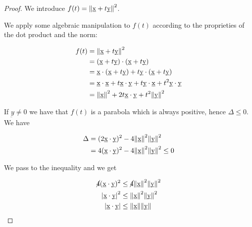 \documentclass[10pt]{extarticle}
\begin{document}
\begin{proof}
    We introduce $f(t) = \norm{\underbar{x} + t \underbar{y}}^2$.

    We apply some algebraic manipulation to $f(t)$ according to the proprieties of the dot product and the norm:

    \begin{align*}
        f(t) & = \norm{\underbar{x} + t \underbar{y}}^2                                                                                                        \\
             & = (\underbar{x} + t \underbar{y}) \cdot (\underbar{x} + t \underbar{y})                                                                         \\
             & = \underbar{x} \cdot (\underbar{x} + t \underbar{y}) + t \underbar{y} \cdot (\underbar{x} + t \underbar{y})                                     \\
             & = \underbar{x} \cdot \underbar{x} + t \underbar{x} \cdot \underbar{y} + t \underbar{y} \cdot \underbar{x} + t^2 \underbar{y} \cdot \underbar{y} \\
             & = \norm{\underbar{x}}^2 + 2t \underbar{x} \cdot \underbar{y} + t^2 \norm{\underbar{y}}^2
    \end{align*}

    If $\underbar{y} \ne 0$ we have that $f(t)$ is a parabola which is always positive, hence $\Delta \leq 0$. We have

    \begin{align*}
        \Delta & = (2 \underbar{x} \cdot \underbar{y})^2 - 4 \norm{\underbar{x}}^2 \norm{\underbar{y}}^2        \\
               & = 4 (\underbar{x} \cdot \underbar{y})^2 - 4 \norm{\underbar{x}}^2 \norm{\underbar{y}}^2 \leq 0 \\
    \end{align*}

    We pass to the inequality and we get

    \begin{align*}
        \cancel{4}(\underbar{x} \cdot \underbar{y})^2 & \leq \cancel{4} \norm{\underbar{x}}^2 \norm{\underbar{y}}^2 \\
        \abs{\underbar{x} \cdot \underbar{y}} ^2      & \leq \norm{\underbar{x}}^2 \norm{\underbar{y}}^2            \\
        \abs{\underbar{x} \cdot \underbar{y}}         & \leq \norm{\underbar{x}} \norm{\underbar{y}}
    \end{align*}
\end{proof}
\end{document}
